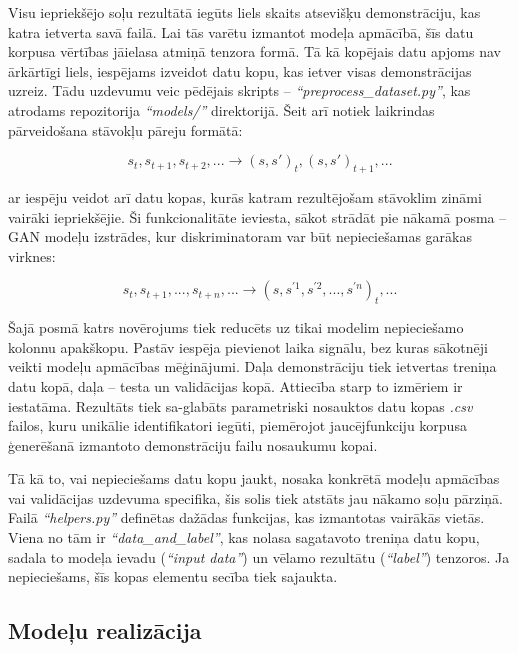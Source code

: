 \documentclass[12pt, a4paper]{article}
\numberwithin{equation}{section} %
\begin{document}
Visu iepriekšējo soļu rezultātā iegūts liels skaits atsevišķu demonstrāciju, kas katra ietverta savā failā. Lai tās varētu izmantot modeļa apmācībā, šīs datu korpusa vērtības jāielasa atmiņā tenzora formā. Tā kā kopējais datu apjoms nav ārkārtīgi liels, iespējams izveidot datu kopu, kas ietver visas demonstrācijas uzreiz. Tādu uzdevumu veic pēdējais skripts -- \textit{``preprocess\_dataset.py''}, kas atrodams repozitorija \textit{``models/''} direktorijā. Šeit arī notiek laikrindas pārveidošana stāvokļu pāreju formātā:

\begin{equation}
    s_t, s_{t+1}, s_{t+2}, ... \rightarrow (s,s')_t, (s,s')_{t+1}, ...
\end{equation}

ar iespēju veidot arī datu kopas, kurās katram rezultējošam stāvoklim zināmi vairāki iepriekšējie. Ši funkcionalitāte ieviesta, sākot strādāt pie nākamā posma -- GAN modeļu izstrādes, kur diskriminatoram var būt nepieciešamas garākas virknes:

\begin{equation}
    s_t, s_{t+1}, ..., s_{t+n}, ... \rightarrow (s,s^{'1}, s^{'2}, ..., s^{'n})_t, ...
\end{equation}

Šajā posmā katrs novērojums tiek reducēts uz tikai modelim nepieciešamo kolonnu apakškopu. Pastāv iespēja pievienot laika signālu, bez kuras sākotnēji veikti modeļu apmācības mēģinājumi. Daļa demonstrāciju tiek ietvertas treniņa datu kopā, daļa -- testa un validācijas kopā. Attiecība starp to izmēriem ir iestatāma. Rezultāts tiek sa-glabāts parametriski nosauktos datu kopas \textit{.csv} failos, kuru unikālie identifikatori iegūti, piemērojot jaucējfunkciju korpusa ģenerēšanā izmantoto demonstrāciju failu nosaukumu kopai.

Tā kā to, vai nepieciešams datu kopu jaukt, nosaka konkrētā modeļu apmācības vai validācijas uzdevuma specifika, šis solis tiek atstāts jau nākamo soļu pārziņā. Failā \textit{``helpers.py''} definētas dažādas funkcijas, kas izmantotas vairākās vietās. Viena no tām ir \textit{``data\_and\_label''}, kas nolasa sagatavoto treniņa datu kopu, sadala to modeļa ievadu (\textit{``input data''}) un vēlamo rezultātu (\textit{``label''}) tenzoros. Ja nepieciešams, šīs kopas elementu secība tiek sajaukta.


\subsection{Modeļu realizācija}
\end{document}
